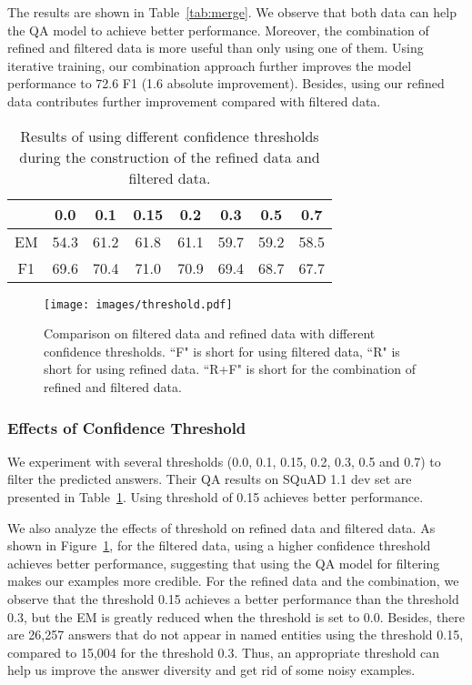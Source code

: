 \documentclass[11pt,a4paper]{article}
\begin{document}
The results are shown in Table~\ref{tab:merge}. We observe that both data can help the QA model to achieve better performance. Moreover, the combination of refined and filtered data is more useful than only using one of them.
Using iterative training, our combination approach further improves the model performance to 72.6 F1 (1.6 absolute improvement).
Besides, using our refined data contributes further improvement compared with filtered data.












\begin{table}[t]
    \small
    \centering
    \begin{tabular}{cccccccc}
        \toprule
         & 0.0 & 0.1 & 0.15 & 0.2 & 0.3 & 0.5 & 0.7  \\ \midrule
        EM & 54.3 & 61.2 & 61.8 & 61.1 & 59.7 & 59.2 & 58.5 \\
        F1 & 69.6 & 70.4 & 71.0 & 70.9 & 69.4 & 68.7 & 67.7 \\
        \bottomrule
    \end{tabular}
    \caption{Results of using different confidence thresholds during the construction of the refined data and filtered data.}
    \label{tab:threshold}
\end{table}

\begin{figure}[t]
\centering
\texttt{[image: images/threshold.pdf]}
\caption{Comparison on filtered data and refined data with different confidence thresholds. ``F" is short for using filtered data, ``R" is short for using refined data. ``R+F" is short for the combination of refined and filtered data.}
\label{fig:threshold}
\end{figure}

\subsubsection{Effects of Confidence Threshold}
We experiment with several thresholds (0.0, 0.1, 0.15, 0.2, 0.3, 0.5 and 0.7) to filter the predicted answers. Their QA results on SQuAD 1.1 dev set are presented in Table~\ref{tab:threshold}. Using threshold of 0.15 achieves better performance. 



We also analyze the effects of threshold on refined data and filtered data.
As shown in Figure~\ref{fig:threshold}, for the filtered data, using a higher confidence threshold achieves better performance, suggesting that using the QA model for filtering makes our examples more credible.
For the refined data and the combination, we observe that the threshold 0.15 achieves a better performance than the threshold 0.3, but the EM is greatly reduced when the threshold is set to 0.0. Besides, there are 26,257 answers that do not appear in named entities using the threshold 0.15, compared to 15,004 for the threshold 0.3. Thus, an appropriate threshold can help us improve the answer diversity and get rid of some noisy examples.
\end{document}
